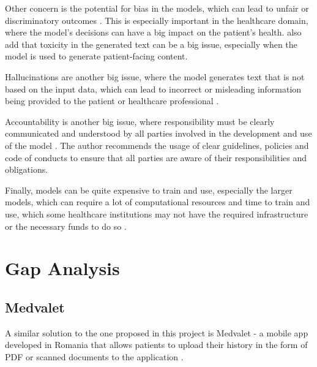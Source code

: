 Other concern is the potential for bias in the models, which can lead to unfair or discriminatory outcomes \parencite{llm_healthcare,llm_healthcare2}. This is especially important in the healthcare domain, where the model's decisions can have a big impact on the patient's health. \textcite{llm_healthcare4} also add that toxicity in the generated text can be a big issue, especially when the model is used to generate patient-facing content. 

Hallucinations are another big issue, where the model generates text that is not based on the input data, which can lead to incorrect or misleading information being provided to the patient or healthcare professional \parencite{llm_healthcare4,llm_healthcare}.

Accountability is another big issue, where responsibility must be clearly communicated and understood by all parties involved in the development and use of the model \parencite{llm_healthcare2}. The author recommends the usage of clear guidelines, policies and code of conducts to ensure that all parties are aware of their responsibilities and obligations.

Finally, models can be quite expensive to train and use, especially the larger models, which can require a lot of computational resources and time to train and use, which some healthcare institutions may not have the required infrastructure or the necessary funds to do so \parencite{llm_healthcare4}.

\section{Gap Analysis}

\subsection{Medvalet}

A similar solution to the one proposed in this project is Medvalet - a mobile app developed in Romania that allows patients to upload their history in the form of PDF or scanned documents to the application \parencite{medvalet}. 

